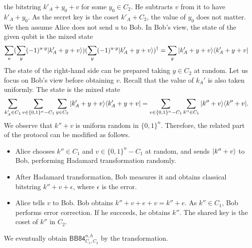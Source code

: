 the bitstring $k'_A+y_0+v$ for some $y_0 \in C_2$. He subtracts $v$ from
it to have $k'_A+y_0$. As the secret key is the coset $k'_A + C_2$,
the value of $y_0$ does not matter. We then assume
Alice does not send $u$ to Bob. In Bob's view, the state of
the given qubit is the mixed state
\[
 \sum_u (\sum_{y}(-1)^{u \cdot y}
 |k'_A+y+v\rangle)
 (\sum_{y}(-1)^{u \cdot y}
 |k'_A+y+v\rangle)^\dagger = \sum_{y}|k'_A + y + v\rangle
 \langle k'_A + y + v|
\]
The state of the right-hand side can be prepared taking $y \in C_2$ at 
random. Let us focus on Bob's view before obtaining $v$. Recall that
the value of $k_A'$ is also taken uniformly.
The state is the mixed state
\[
 \sum_{k'_A \in C_1} \sum_{v \in \{0,1\}^n - C_1} \sum_{y \in C_2} 
  |k'_A + y + v\rangle\langle k'_A + y + v| = 
 \sum_{v \in \{0,1\}^n - C_1} \sum_{k'' \in C_1}|k''+ v\rangle\langle k''+ v|.
\]
We observe that $k'' + v$ is uniform random in $\{0,1\}^n$.
Therefore, the related part of the protocol can be modified as follows.
\begin{itemize}
 \item Alice chooses $k'' \in C_1$ and $v \in \{0,1\}^n - C_1$
       at random, and sends $|k''+v\rangle$ to Bob, performing Hadamard
       transformation randomly.
 \item After Hadamard transformation, 
       Bob measures it and obtains classical bitstring $k'' + v + 
       \epsilon$, where $\epsilon$ is the error.
 \item Alice tells $v$ to Bob. Bob obtains $k'' + v + e + v = 
       k'' + e$. As $k''\in C_1$, Bob performs error correction.
       If he succeeds, he obtains $k''$. The shared key is the coset of 
       $k''$ in $C_2$.
\end{itemize}
We eventually obtain $\mathsf{BB84}^{n,h}_{C_1,C_2}$ by the transformation.

